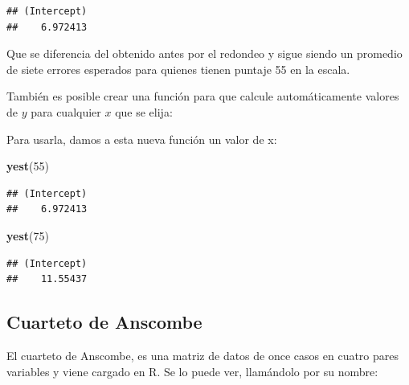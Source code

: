 \documentclass[]{book}
\newenvironment{Shaded}{\begin{snugshade}}{\end{snugshade}}
\newcommand{\ControlFlowTok}[1]{\textcolor[rgb]{0.13,0.29,0.53}{\textbf{#1}}}
\newcommand{\DecValTok}[1]{\textcolor[rgb]{0.00,0.00,0.81}{#1}}
\newcommand{\FloatTok}[1]{\textcolor[rgb]{0.00,0.00,0.81}{#1}}
\newcommand{\KeywordTok}[1]{\textcolor[rgb]{0.13,0.29,0.53}{\textbf{#1}}}
\newcommand{\NormalTok}[1]{#1}
\newcommand{\OperatorTok}[1]{\textcolor[rgb]{0.81,0.36,0.00}{\textbf{#1}}}
\newcommand{\StringTok}[1]{\textcolor[rgb]{0.31,0.60,0.02}{#1}}
\begin{document}
\begin{verbatim}
## (Intercept) 
##    6.972413
\end{verbatim}

Que se diferencia del obtenido antes por el redondeo y sigue siendo un promedio de siete errores esperados para quienes tienen puntaje 55 en la escala.

También es posible crear una función para que calcule automáticamente valores de \(y\) para cualquier \(x\) que se elija:

\begin{Shaded}
\end{Shaded}

Para usarla, damos a esta nueva función un valor de x:

\begin{Shaded}
\begin{Highlighting}[]
\KeywordTok{yest}\NormalTok{(}\DecValTok{55}\NormalTok{)}
\end{Highlighting}
\end{Shaded}

\begin{verbatim}
## (Intercept) 
##    6.972413
\end{verbatim}

\begin{Shaded}
\begin{Highlighting}[]
\KeywordTok{yest}\NormalTok{(}\DecValTok{75}\NormalTok{)}
\end{Highlighting}
\end{Shaded}

\begin{verbatim}
## (Intercept) 
##    11.55437
\end{verbatim}

\hypertarget{cuarteto-de-anscombe}{%
\subsection{Cuarteto de Anscombe}\label{cuarteto-de-anscombe}}

El cuarteto de Anscombe, es una matriz de datos de once casos en cuatro pares variables y viene cargado en R. Se lo puede ver, llamándolo por su nombre:
\end{document}

